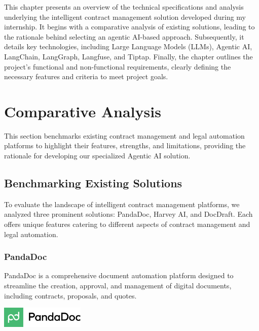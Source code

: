 This chapter presents an overview of the technical specifications and analysis underlying the intelligent contract management solution developed during my internship. It begins with a comparative analysis of existing solutions, leading to the rationale behind selecting an agentic AI-based approach. Subsequently, it details key technologies, including Large Language Models (LLMs), Agentic AI, LangChain, LangGraph, Langfuse, and Tiptap. Finally, the chapter outlines the project’s functional and non-functional requirements, clearly defining the necessary features and criteria to meet project goals.

\newpage
{}
\hypertarget{secondchapter}{}
\section{Comparative Analysis}

This section benchmarks existing contract management and legal automation platforms to highlight their features, strengths, and limitations, providing the rationale for developing our specialized Agentic AI solution.

\subsection{Benchmarking Existing Solutions}
To evaluate the landscape of intelligent contract management platforms, we analyzed three prominent solutions: PandaDoc, Harvey AI, and DocDraft. Each offers unique features catering to different aspects of contract management and legal automation.

\subsubsection{PandaDoc}
PandaDoc is a comprehensive document automation platform designed to streamline the creation, approval, and management of digital documents, including contracts, proposals, and quotes.\mynewline

\begin{center}
    \centering
    \includegraphics[width=0.3\textwidth]{Images/PandaDoc_logo.png}
     \cite{pandadoc}
    \label{fig:pandadoc}
\end{center}

